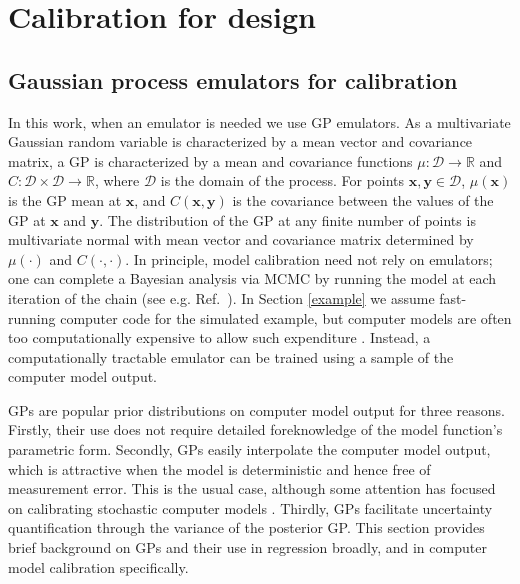 \documentclass[twocolumn,10pt]{asme2ej}
\begin{document}
%
\section{Calibration for design}\label{calib_for_design}

%
\subsection{Gaussian process emulators for calibration}
%
In this work, when an emulator is needed we use GP emulators.
%
As a multivariate Gaussian random variable is characterized by a mean vector and covariance matrix, a GP is characterized by a mean and covariance functions $\mu:\mathcal D\to \mathbb R$ and $C:\mathcal D\times \mathcal D\to \mathbb R$, where $\mathcal D$ is the domain of the process. 
%
For points $\mathbf x,\mathbf y\in \mathcal D$, $\mu(\mathbf x)$ is the GP mean at $\mathbf x$, and $C(\mathbf x, \mathbf y)$ is the covariance between the values of the GP at $\mathbf x$ and $\mathbf y$.
%
The distribution of the GP at any finite number of points is multivariate normal with mean vector and covariance matrix determined by $\mu(\cdot)$ and $C(\cdot,\cdot)$.
%
In principle, model calibration need not rely on emulators; one can complete a Bayesian analysis via MCMC by running the model at each iteration of the chain (see e.g. Ref.\  \cite{Hemez2011}). 
%
In Section \ref{example} we assume fast-running computer code for the simulated example, but
%
computer models are often too computationally expensive to allow such expenditure \cite{VanBuren2013,VanBuren2014}.
%
Instead, a computationally tractable emulator can be trained using a sample of the computer model output. 
%

%
GPs are popular prior distributions on computer model output for three reasons.
%
Firstly, their use does not require detailed foreknowledge of the model function's parametric form. 
%
Secondly, GPs easily interpolate the computer model output, which is attractive when the model is deterministic and hence free of measurement error. 
%
This is the usual case, although some attention has focused on calibrating stochastic computer models \cite{Pratola2018}. 
%
Thirdly, GPs facilitate uncertainty quantification through the variance of the posterior GP. 
%
This section provides brief background on GPs and their use in regression broadly, and in computer model calibration specifically.
%
\end{document}
